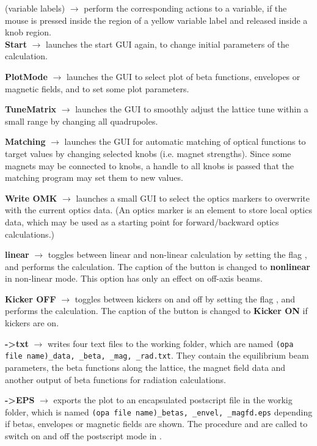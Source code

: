 \documentclass[12pt]{article}
\newcommand\code[1]{{\tt #1}}
\newcommand{\ofld}[1]{\colorbox{black!15}{{{\color{black}\bf #1}}}}
\newcommand{\ofldx}[1]{\colorbox{black!15}{{\color{black}(#1)}}}
\newcommand\guico[1]{{\color{blue}\code{#1}}}
\newcommand\guifco[1]{{\color{violet}\code{#1}}}
\newcommand{\unico}[1]{{\color{burntorange}\code{#1}}}
\newcommand{\evcod}[2]{\ofld{#1} $\rightarrow$ \guico{#2}}
\newcommand{\evcodx}[2]{\ofldx{#1} $\rightarrow$ \guico{#2}}
\newcommand{\opagui}[1]{\colorbox{blue!20}{{\color{black}\code{#1}}}}
\newcommand{\ogui}[1]{\hyperref[#1]{\opagui{#1}}}
\newcommand{\opauni}[1]{\colorbox{orange!30}{{\color{black}\code{#1}}}}
\newcommand{\ouni}[1]{\hyperref[#1]{\opauni{#1}}}
\begin{document}
{\evcodx{variable labels}{varbutMouseDown, varbutMouseUp} perform the corresponding actions to a variable, if the mouse is pressed inside the region of a yellow variable label and released inside a knob region.\\

\evcod{Start}{butStarClick} launches the start GUI \ogui{ostartmenu} again, to change initial parameters of the calculation.

\evcod{PlotMode}{butenvlClick} launches the GUI \ogui{obetenvmag} to select plot of beta functions, envelopes or magnetic fields, and to set some plot parameters.

\evcod{TuneMatrix}{buttuneClick} launches the GUI \ogui{otunematrix} to smoothly adjust the lattice tune within a small range by changing all quadrupoles.

\evcod{Matching}{butmatClick} launches the GUI \ogui{omatching} for automatic matching of optical functions to target values by changing selected knobs (i.e. magnet strengths). Since some magnets may be connected to knobs, a handle to all knobs is passed that the matching program may set them to new values.

\evcod{Write OMK}{butwomkClick} launches a small GUI \ogui{owriteomrk} to select the optics markers to overwrite with the current optics data. (An optics marker is an element to store local optics data, which may be used as a starting point for forward/backward optics calculations.)

\evcod{linear}{butnlinClick} toggles between linear and non-linear calculation by setting the flag \unico{UseSext}, and performs the calculation. The caption of the button is changed to \ofld{nonlinear} in non-linear mode. This option has only an effect on off-axis beams.

\evcod{Kicker OFF}{butkickClick} toggles between kickers on and off by setting the flag \unico{UsePulsed}, and performs the calculation. The caption of the button is changed to \ofld{Kicker ON} if kickers are on.

\evcod{-\textgreater txt}{butdataClick} writes four text files to the working folder, which are named \code{(opa file name)\_data, \_beta, \_mag, \_rad.txt}. They contain the equilibrium beam parameters, the beta functions along the lattice, the magnet field data and another output of beta functions for radiation calculations. 

\evcod{-\textgreater EPS}{butepsClick} exports the plot to an encapsulated postscript file in the workig folder, which is named \code{(opa file name)\_betas, \_envel, \_magfd.eps} depending if betas, envelopes or magnetic fields are shown. 
The procedure \guifco{PS\_start} and \guifco{PS\_stop} are called to switch on and off the postscript mode in \ouni{comvgraphlib}.

}
\end{document}
